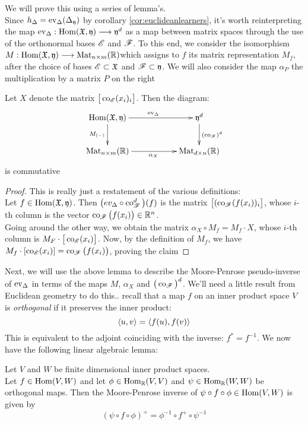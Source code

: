We will prove this using a series of lemma's.\\ 
Since $h_\Delta = \operatorname{ev}_\Delta(\Delta_{\mathfrak{y}})$ by corollary \ref{cor:euclideanlearners}, it's worth reinterpreting the map $\operatorname{ev}_\Delta: \operatorname{Hom}(\mathfrak{X},\mathfrak{y})\longrightarrow \mathfrak{y}^d$ as a map between matrix spaces through the use of the orthonormal bases $\r{E}$ and $\r{F}$. To this end, we consider the isomorphism $M: \operatorname{Hom}(\mathfrak{X},\mathfrak{y})\longrightarrow \operatorname{Mat}_{n\times m}(\mathbb{R})$which assigns to $f$ its matrix representation $M_f$,  after the choice of bases $\r{E}\subset \f{X}$ and $\r{F}\subset \f{y}$. We will also consider the map $\alpha_P$ the multiplication by a matrix $P$ on the right


\begin{lemma}\label{lem:lrcoorddiagram}
	Let $ X$ denote the matrix $\big[ \co_{\r{E}}(x_i)_i\big]$. Then the diagram:
	\begin{displaymath}
	\xymatrix{
	\Hom(\f{X},\f{y}) \ar[rr]^{\ev_\Delta}\ar[d]_{M_{(-)}}&& \f{y}^d\ar[d]^{(\co_{\r{F}})^d}\\
	\Mat_{n\times m}(\d{R})\ar[rr]_{\alpha_X}&&\Mat_{d\times n}(\d{R})	
	}
	\end{displaymath}
is commutative
\end{lemma}

\begin{proof}
	This is really just a restatement of the various definitions: \\Let $f\in \operatorname{Hom}(\mathfrak{X},\mathfrak{y})$. Then $\big(ev_\Delta \circ \co_\r{F}^d\big)(f)$ is the matrix $\big[(\co_{\r{F}}(f(x_i))_{i}\big]$, whose $i$-th column is the vector $\co_{\r{F}}\big(f(x_i)\big)\in \d{R}^n$.\\
	Going around the other way,  we obtain the matrix $\alpha_{X} \circ M_f=M_f\cdot X$, whose $i$-th column is $M_F\cdot \big[\co_{\r{E}}(x_i)\big]$. Now, by the definition of $M_f$, we have $M_f\cdot [\co_{\r{E}}(x_i)]=\co_{\r{F}}\big(f(x_i)\big)$, proving the claim

\end{proof}


Next, we will use the above lemma to describe the Moore-Penrose pseudo-inverse of $\operatorname{ev}_\Delta$ in terms of the maps $M$, $\alpha_X$ and $\big(\co_{\r{F}}\big)^d$. We'll need a little result from Euclidean geometry to do this..  recall that a map $f$ on an inner product space $V$ is \emph{orthogonal} if it preserves the inner product: 
\[
\left\langle u,v\right\rangle=\left\langle f(u),f(v)\right\rangle
\]
This is equivalent to the adjoint coinciding with the inverse: $f^*=f^{-1}$. We now have the following linear algebraic lemma:
\begin{lemma}
Let $V$ and $W$ be finite dimensional inner product spaces.\\
	Let $f \in \operatorname{Hom} (V,W)$ and let $\phi \in \operatorname{Hom}_{\mathbb{R}}(V,V)$ and $\psi \in \operatorname{Hom}_{\mathbb{R}}(W,W)$ be orthogonal maps. Then the Moore-Penrose inverse of $\psi \circ f\circ \phi \in \operatorname{Hom}(V,W)$ is given by
	\[
	(\psi \circ f\circ \phi )^+ = \phi^{-1}\circ f^+ \circ \psi^{-1}
	\]
\end{lemma}


